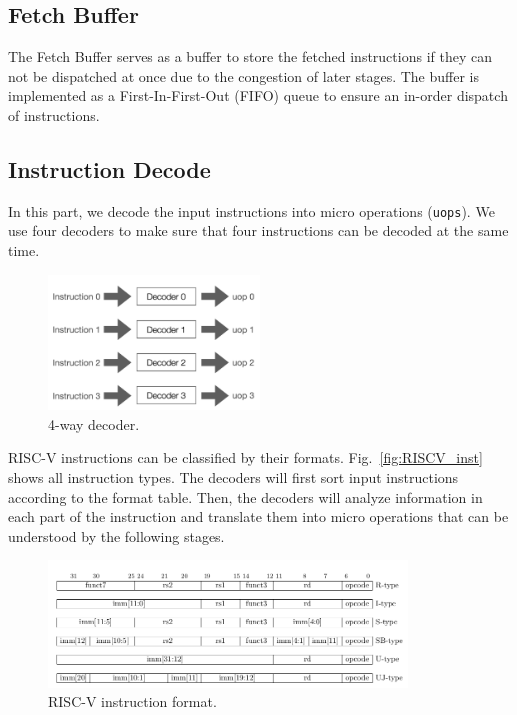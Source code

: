 \subsection{Fetch Buffer} %
The Fetch Buffer serves as a buffer to store the fetched instructions if they can not be dispatched at once due to the congestion of later stages. The buffer is implemented as a First-In-First-Out (FIFO) queue to ensure an in-order dispatch of instructions.

\subsection{Instruction Decode} %
In this part, we decode the input instructions into micro operations (\texttt{uops}). We use four decoders to make sure that four instructions can be decoded at the same time.

\begin{figure}[!htp]
    \centering
    \includegraphics[width=0.5\textwidth]{figure/decode.png}
    \caption{4-way decoder.}
    \label{fig:decoder}
\end{figure}

RISC-V instructions can be classified by their formats. Fig.~\ref{fig:RISCV_inst} shows all instruction types. The decoders will first sort input instructions according to the format table. Then, the decoders will analyze information in each part of the instruction and translate them into micro operations that can be understood by the following stages.

\begin{figure}[!htp]
    \centering
    \includegraphics[width=0.85\textwidth]{figure/riscv-isa.png}
    \caption{RISC-V instruction format\cite{RISC-V_unprivileged_ISA}.}
    \label{fig:RISCV_inst1}
\end{figure}

